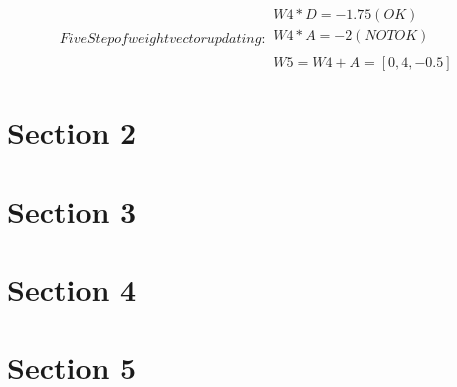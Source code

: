 \documentclass{report}
\begin{document}
\begin{subequations}
  Five Step of weight vector updating:
  \begin{flalign*}
    W4 * D = -1.75 (OK) \\
    W4 * A = -2 (NOT OK) \\
    \\
    W5 = W4 + A = [0, 4, -0.5]
  \end{flalign*}
\end{subequations}

\chapter{Section 2}


\chapter{Section 3}

\chapter{Section 4}

\chapter{Section 5}
\end{document}

